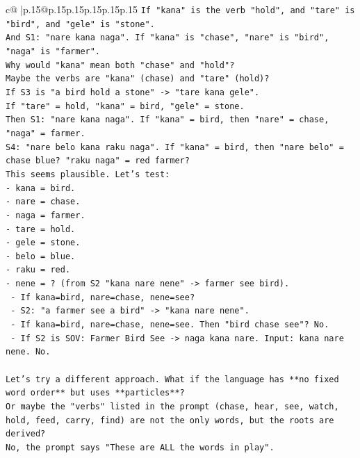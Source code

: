 \documentclass{article}
\begin{document}
{\begin{supertabular}{c@{$\;$}|p{.15\linewidth}@{}p{.15\linewidth}p{.15\linewidth}p{.15\linewidth}p{.15\linewidth}p{.15\linewidth}}
{{{\texttt{If "kana" is the verb "hold", and "tare" is "bird", and "gele" is "stone".} \\
\texttt{And S1: "nare kana naga". If "kana" is "chase", "nare" is "bird", "naga" is "farmer".} \\
\texttt{Why would "kana" mean both "chase" and "hold"?} \\
\texttt{Maybe the verbs are "kana" (chase) and "tare" (hold)?} \\
\texttt{If S3 is "a bird hold a stone" {-}> "tare kana gele".} \\
\texttt{If "tare" = hold, "kana" = bird, "gele" = stone.} \\
\texttt{Then S1: "nare kana naga". If "kana" = bird, then "nare" = chase, "naga" = farmer.} \\
\texttt{S4: "nare belo kana raku naga". If "kana" = bird, then "nare belo" = chase blue? "raku naga" = red farmer?} \\
\texttt{This seems plausible. Let's test:} \\
\texttt{{-} kana = bird.} \\
\texttt{{-} nare = chase.} \\
\texttt{{-} naga = farmer.} \\
\texttt{{-} tare = hold.} \\
\texttt{{-} gele = stone.} \\
\texttt{{-} belo = blue.} \\
\texttt{{-} raku = red.} \\
\texttt{{-} nene = ? (from S2 "kana nare nene" {-}> farmer see bird).} \\
\texttt{  {-} If kana=bird, nare=chase, nene=see?} \\
\texttt{  {-} S2: "a farmer see a bird" {-}> "kana nare nene".} \\
\texttt{  {-} If kana=bird, nare=chase, nene=see. Then "bird chase see"? No.} \\
\texttt{  {-} If S2 is SOV: Farmer Bird See {-}> naga kana nare. Input: kana nare nene. No.} \\
\\ 
\texttt{Let's try a different approach. What if the language has **no fixed word order** but uses **particles**?} \\
\texttt{Or maybe the "verbs" listed in the prompt (chase, hear, see, watch, hold, feed, carry, find) are not the only words, but the roots are derived?} \\
\texttt{No, the prompt says "These are ALL the words in play".} \\
}}}
\end{supertabular}}
\end{document}
